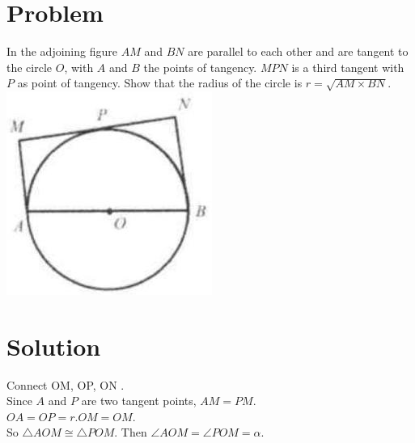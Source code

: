 \documentclass{article}
\begin{document}
\section*{Problem}
In the adjoining figure \(A M\) and \(B N\) are parallel to each other and are tangent to the circle \(O\), with \(A\) and \(B\) the points of tangency. \(M P N\) is a third tangent with \(P\) as point of tangency. Show that the radius of the circle is \(r=\sqrt{A M \times B N}\).\\
\centering
\includegraphics[width=\textwidth]{images/155(1).jpg}

\section*{Solution}
Connect OM, OP, ON .\\
Since \(A\) and \(P\) are two tangent points, \(A M=P M\).\\
\(O A=O P=r . O M=O M\).\\
So \(\triangle A O M \cong \triangle P O M\). Then \(\angle A O M=\angle P O M=\alpha\).
\end{document}
